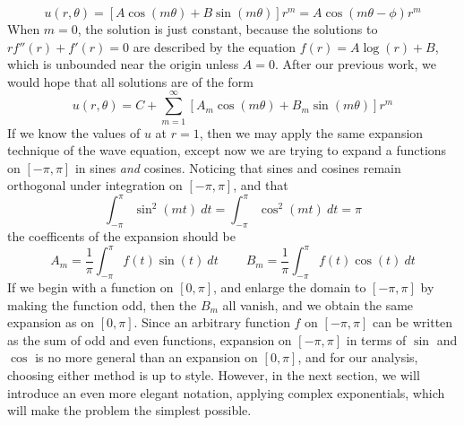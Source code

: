%
\[ u(r,\theta) = [A \cos(m \theta) + B \sin(m \theta)] r^m = A \cos(m \theta - \phi) r^m \]
%
When $m = 0$, the solution is just constant, because the solutions to $r f''(r) + f'(r) = 0$ are described by the equation $f(r) = A \log(r) + B$, which is unbounded near the origin unless $A = 0$. After our previous work, we would hope that all solutions are of the form
%
\[ u(r,\theta) = C + \sum_{m = 1}^\infty [A_m \cos(m \theta) + B_m \sin(m \theta)] r^m \]
%
If we know the values of $u$ at $r = 1$, then we may apply the same expansion technique of the wave equation, except now we are trying to expand a functions on $[-\pi,\pi]$ in sines {\it and} cosines. Noticing that sines and cosines remain orthogonal under integration on $[-\pi,\pi]$, and that
%
\[ \int_{-\pi}^\pi \sin^2(mt)\ dt = \int_{-\pi}^\pi \cos^2(mt)\ dt = \pi \]
%
the coefficents of the expansion should be
%
\[ A_m = \frac{1}{\pi} \int_{-\pi}^\pi f(t) \sin(t)\ dt\ \ \ \ \ \ \ \ \ \ B_m = \frac{1}{\pi} \int_{-\pi}^\pi f(t) \cos(t)\ dt \]
%
If we begin with a function on $[0,\pi]$, and enlarge the domain to $[-\pi,\pi]$ by making the function odd, then the $B_m$ all vanish, and we obtain the same expansion as on $[0,\pi]$. Since an arbitrary function $f$ on $[-\pi,\pi]$ can be written as the sum of odd and even functions, expansion on $[-\pi,\pi]$ in terms of $\sin$ and $\cos$ is no more general than an expansion on $[0,\pi]$, and for our analysis, choosing either method is up to style. However, in the next section, we will introduce an even more elegant notation, applying complex exponentials, which will make the problem the simplest possible.


